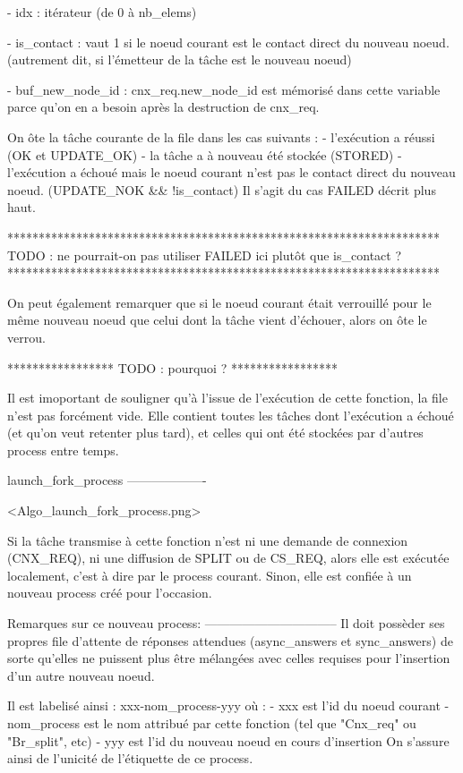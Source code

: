     - idx        :      itérateur (de 0 à nb_elems)

    - is_contact :      vaut 1 si le noeud courant est le contact direct du nouveau noeud.
                        (autrement dit, si l'émetteur de la tâche est le nouveau noeud)

    - buf_new_node_id : cnx_req.new_node_id est mémorisé dans cette variable parce qu'on en a besoin
                        après la destruction de cnx_req.

    On ôte la tâche courante de la file dans les cas suivants :
        - l'exécution a réussi (OK et UPDATE_OK)
        - la tâche a à nouveau été stockée (STORED)
        - l'exécution a échoué mais le noeud courant n'est pas le contact direct du nouveau noeud.
          (UPDATE_NOK && !is_contact)
          Il s'agit du cas FAILED décrit plus haut.

*********************************************************************
TODO : ne pourrait-on pas utiliser FAILED ici plutôt que is_contact ?
*********************************************************************

On peut également remarquer que si le noeud courant était verrouillé pour le même nouveau noeud que
celui dont la tâche vient d'échouer, alors on ôte le verrou.

*****************
TODO : pourquoi ?
*****************

Il est imoportant de souligner qu'à l'issue de l'exécution de cette fonction, la file n'est pas
forcément vide. Elle contient toutes les tâches dont l'exécution a échoué (et qu'on veut retenter
plus tard), et celles qui ont été stockées par d'autres process entre temps.


launch_fork_process
-------------------

<Algo_launch_fork_process.png>

Si la tâche transmise à cette fonction n'est ni une demande de connexion (CNX_REQ), ni une
diffusion de SPLIT ou de CS_REQ, alors elle est exécutée localement, c'est à dire par le process
courant. Sinon, elle est confiée à un nouveau process créé pour l'occasion.

Remarques sur ce nouveau process:
--------------------------------
Il doit possèder ses propres file d'attente de réponses attendues (async_answers et sync_answers)
de sorte qu'elles ne puissent plus être mélangées avec celles requises pour l'insertion d'un autre
nouveau noeud.

Il est labelisé ainsi : xxx-nom_process-yyy où :
  - xxx est l'id du noeud courant
  - nom_process est le nom attribué par cette fonction (tel que "Cnx_req" ou "Br_split", etc)
  - yyy est l'id du nouveau noeud en cours d'insertion
On s'assure ainsi de l'unicité de l'étiquette de ce process.

